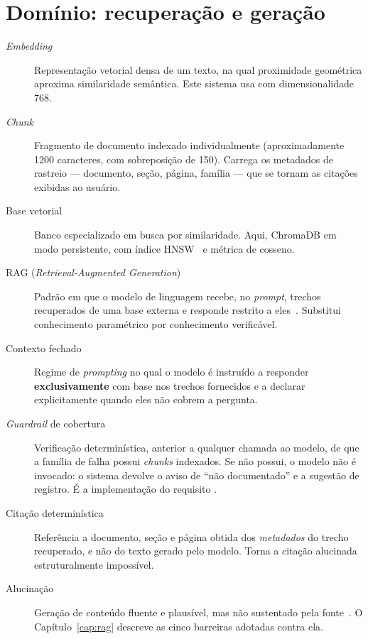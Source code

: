 \section{Domínio: recuperação e geração}

\begin{description}
  \item[\textit{Embedding}] Representação vetorial densa de um texto, na qual
    proximidade geométrica aproxima similaridade semântica. Este sistema usa
     com dimensionalidade 768.

  \item[\textit{Chunk}] Fragmento de documento indexado individualmente
    (aproximadamente \num{1200} caracteres, com sobreposição de 150). Carrega os
    metadados de rastreio --- documento, seção, página, família --- que se
    tornam as citações exibidas ao usuário.

  \item[Base vetorial] Banco especializado em busca por similaridade. Aqui,
    ChromaDB em modo persistente, com índice HNSW~\cite{malkov2020hnsw} e
    métrica de cosseno.

  \item[RAG (\textit{Retrieval-Augmented Generation})] Padrão em que o modelo
    de linguagem recebe, no \textit{prompt}, trechos recuperados de uma base
    externa e responde restrito a eles~\cite{lewis2020rag}. Substitui
    conhecimento paramétrico por conhecimento verificável.

  \item[Contexto fechado] Regime de \textit{prompting} no qual o modelo é
    instruído a responder \textbf{exclusivamente} com base nos trechos
    fornecidos e a declarar explicitamente quando eles não cobrem a pergunta.

  \item[\textit{Guardrail} de cobertura] Verificação determinística, anterior a
    qualquer chamada ao modelo, de que a família de falha possui \textit{chunks}
    indexados. Se não possui, o modelo não é invocado: o sistema devolve o aviso
    de \enquote{não documentado} e a sugestão de registro. É a implementação do
    requisito .

  \item[Citação determinística] Referência a documento, seção e página obtida
    dos \emph{metadados} do trecho recuperado, e não do texto gerado pelo
    modelo. Torna a citação alucinada estruturalmente impossível.

  \item[Alucinação] Geração de conteúdo fluente e plausível, mas não sustentado
    pela fonte~\cite{ji2023hallucination}. O Capítulo~\ref{cap:rag} descreve as
    cinco barreiras adotadas contra ela.


\end{description}

